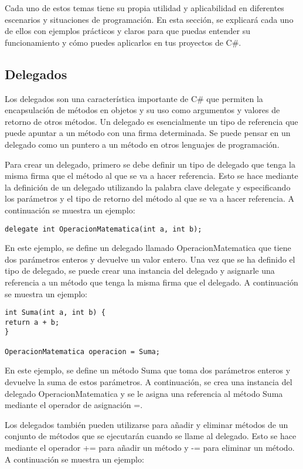\documentclass[executivepaper]{article}
\begin{document}
Cada uno de estos temas tiene su propia utilidad y aplicabilidad en diferentes escenarios y situaciones de programación. En esta sección, se explicará cada uno de ellos con ejemplos prácticos y claros para que puedas entender su funcionamiento y cómo puedes aplicarlos en tus proyectos de C\#.

\subsection{Delegados}

Los delegados son una característica importante de C\# que permiten la encapsulación de métodos en objetos y su uso como argumentos y valores de retorno de otros métodos. Un delegado es esencialmente un tipo de referencia que puede apuntar a un método con una firma determinada. Se puede pensar en un delegado como un puntero a un método en otros lenguajes de programación.

Para crear un delegado, primero se debe definir un tipo de delegado que tenga la misma firma que el método al que se va a hacer referencia. Esto se hace mediante la definición de un delegado utilizando la palabra clave delegate y especificando los parámetros y el tipo de retorno del método al que se va a hacer referencia. A continuación se muestra un ejemplo:

\begin{lstlisting}
delegate int OperacionMatematica(int a, int b);
\end{lstlisting}

En este ejemplo, se define un delegado llamado OperacionMatematica que tiene dos parámetros enteros y devuelve un valor entero. Una vez que se ha definido el tipo de delegado, se puede crear una instancia del delegado y asignarle una referencia a un método que tenga la misma firma que el delegado. A continuación se muestra un ejemplo:

\begin{lstlisting}
int Suma(int a, int b) {
return a + b;
}

OperacionMatematica operacion = Suma;
\end{lstlisting}

En este ejemplo, se define un método Suma que toma dos parámetros enteros y devuelve la suma de estos parámetros. A continuación, se crea una instancia del delegado OperacionMatematica y se le asigna una referencia al método Suma mediante el operador de asignación =.

Los delegados también pueden utilizarse para añadir y eliminar métodos de un conjunto de métodos que se ejecutarán cuando se llame al delegado. Esto se hace mediante el operador += para añadir un método y -= para eliminar un método. A continuación se muestra un ejemplo:
\end{document}
